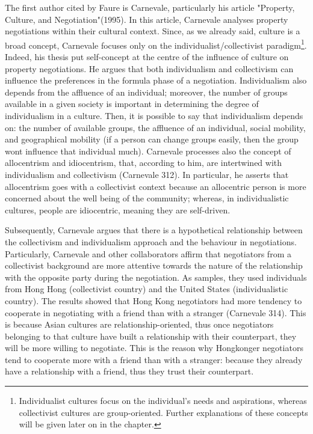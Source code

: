 \documentclass[../main.tex]{subfiles}
\begin{document}
The first author cited by Faure is Carnevale, particularly his article "Property, Culture, and Negotiation"(1995)\cite{carnevale}. In this article, Carnevale analyses property negotiations within their cultural context. Since, as we already said, culture is a broad concept, Carnevale focuses only on the individualist/collectivist paradigm\footnote{Individualist cultures focus on the individual's needs and aspirations, whereas collectivist cultures are group-oriented. Further explanations of these concepts will be given later on in the chapter.}. Indeed, his thesis put self-concept at the centre of the influence of culture on property negotiations. He argues that both individualism and collectivism can influence the preferences in the formula phase of a negotiation. Individualism also depends from the affluence of an individual; moreover, the number of groups available in a given society is important in determining the degree of individualism in a culture. Then, it is possible to say that individualism depends on: the number of available groups, the affluence of an individual, social mobility, and geographical mobility (if a person can change groups easily, then the group wont influence that individual much). Carnevale processes also the concept of allocentrism and idiocentrism, that, according to him, are intertwined with individualism and collectivism (Carnevale 312). In particular, he asserts that allocentrism goes with a collectivist context because an allocentric person is more concerned about the well being of the community; whereas, in individualistic cultures, people are idiocentric, meaning they are self-driven.

Subsequently, Carnevale argues that there is a hypothetical relationship between the collectivism and individualism approach and the behaviour in negotiations. Particularly, Carnevale and other collaborators affirm that negotiators from a collectivist background are more attentive towards the nature of the relationship with the opposite party during the negotiation. As samples, they used individuals from Hong Hong (collectivist country) and the United States (individualistic country). The results showed that Hong Kong negotiators had more tendency to cooperate in negotiating with a friend than with a stranger (Carnevale 314). This is because Asian cultures are relationship-oriented, thus once negotiators belonging to that culture have built a relationship with their counterpart, they will be more willing to negotiate. This is the reason why Hongkonger negotiators tend to cooperate more with a friend than with a stranger: because they already have a relationship with a friend, thus they trust their counterpart.
\end{document}
